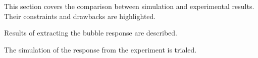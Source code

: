 This section covers the comparison between simulation and experimental results. Their constraints and drawbacks are highlighted. 

Results of extracting the bubble response are described.

The simulation of the response from the experiment is trialed.